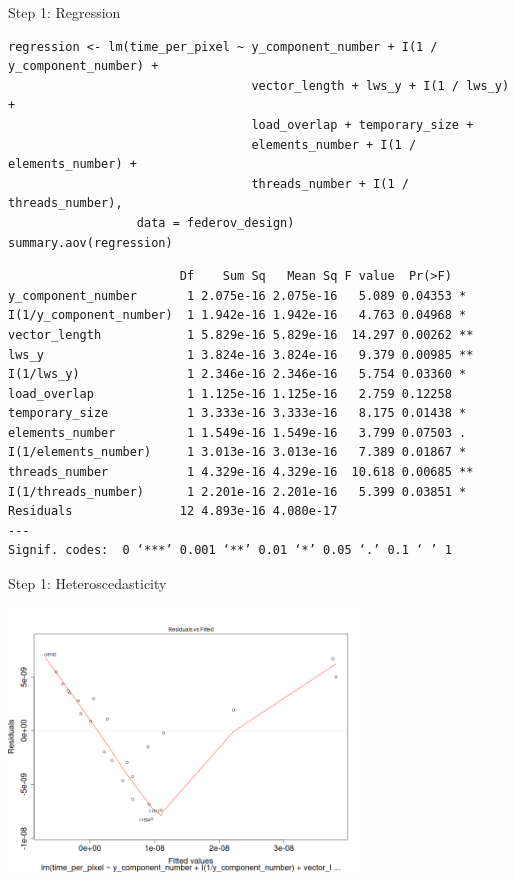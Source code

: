 \documentclass[10pt, compress, aspectratio=169, xcolor={table,usenames,dvipsnames}]{beamer}
\begin{document}
\begin{frame}[fragile,label={sec:org3e0c3f7}]{Step 1: Regression}
 \scriptsize
\lstset{language=r,label= ,caption= ,captionpos=b,numbers=none}
\begin{lstlisting}
regression <- lm(time_per_pixel ~ y_component_number + I(1 / y_component_number) +
                                  vector_length + lws_y + I(1 / lws_y) +
                                  load_overlap + temporary_size +
                                  elements_number + I(1 / elements_number) +
                                  threads_number + I(1 / threads_number),
                  data = federov_design)
summary.aov(regression)
\end{lstlisting}

\begin{verbatim}
                        Df    Sum Sq   Mean Sq F value  Pr(>F)
y_component_number       1 2.075e-16 2.075e-16   5.089 0.04353 *
I(1/y_component_number)  1 1.942e-16 1.942e-16   4.763 0.04968 *
vector_length            1 5.829e-16 5.829e-16  14.297 0.00262 **
lws_y                    1 3.824e-16 3.824e-16   9.379 0.00985 **
I(1/lws_y)               1 2.346e-16 2.346e-16   5.754 0.03360 *
load_overlap             1 1.125e-16 1.125e-16   2.759 0.12258
temporary_size           1 3.333e-16 3.333e-16   8.175 0.01438 *
elements_number          1 1.549e-16 1.549e-16   3.799 0.07503 .
I(1/elements_number)     1 3.013e-16 3.013e-16   7.389 0.01867 *
threads_number           1 4.329e-16 4.329e-16  10.618 0.00685 **
I(1/threads_number)      1 2.201e-16 2.201e-16   5.399 0.03851 *
Residuals               12 4.893e-16 4.080e-17
---
Signif. codes:  0 ‘***’ 0.001 ‘**’ 0.01 ‘*’ 0.05 ‘.’ 0.1 ‘ ’ 1
\end{verbatim}

\normalsize
\end{frame}

\begin{frame}[label={sec:orgc4f895c}]{Step 1: Heteroscedasticity}
\begin{center}
\includegraphics[width=0.7\textwidth]{../img/regression_before_transform.png}
\end{center}
\end{frame}
\end{document}
